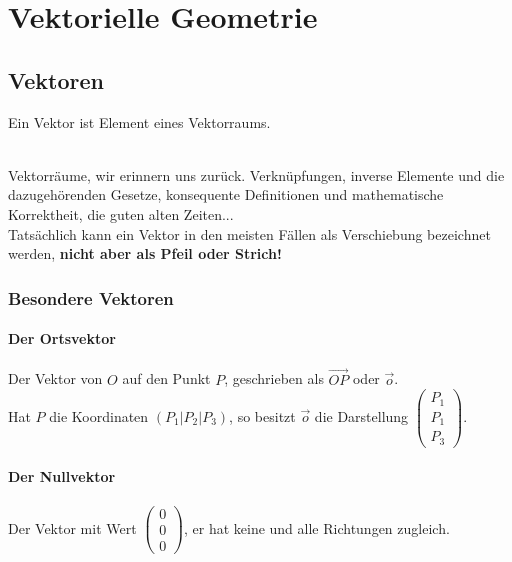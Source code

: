 \chapter{Vektorielle Geometrie}


\section{Vektoren}
\begin{Bws}
Ein Vektor ist Element eines Vektorraums.
\end{Bws}\\
Vektorräume, wir erinnern uns zurück. Verknüpfungen, inverse Elemente und die dazugehörenden Gesetze, konsequente Definitionen und mathematische Korrektheit, die guten alten Zeiten...\\
Tatsächlich kann ein Vektor in den meisten Fällen als Verschiebung bezeichnet werden, \textbf{nicht aber als Pfeil oder Strich!}\\
\subsection{Besondere Vektoren}
\subsubsection{Der Ortsvektor}
Der Vektor von $O$ auf den Punkt $P$, geschrieben als $\vec{OP}$ oder $\vec{o}$.\\
Hat $P$ die Koordinaten $(P_1|P_2|P_3)$, so besitzt $\vec{o}$ die Darstellung $\left(\begin{array}{c} P_1 \\ P_1 \\ P_3\end{array}\right)$.
\subsubsection{Der Nullvektor}
Der Vektor mit Wert $\left(\begin{array}{c} 0 \\ 0 \\ 0\end{array}\right)$, er hat keine und alle Richtungen zugleich.
